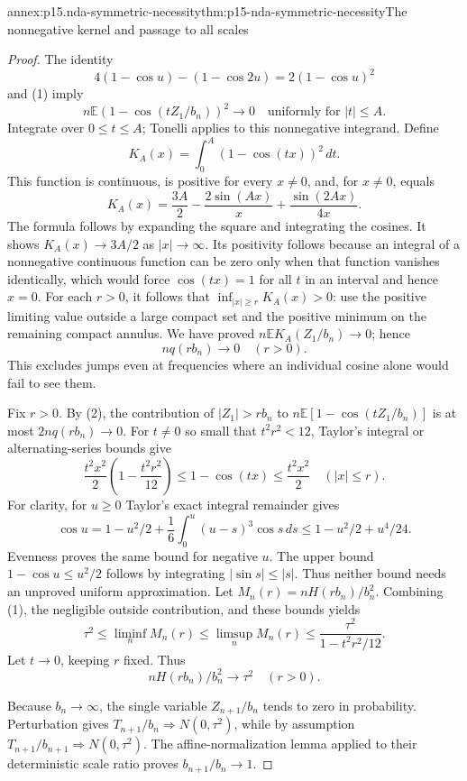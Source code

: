 \begin{annexitem}{annex:p15.nda-symmetric-necessity}{thm:p15-nda-symmetric-necessity}{The nonnegative kernel and passage to all scales}
\begin{proof}
The identity
\[
 4(1-\cos u)-(1-\cos2u)=2(1-\cos u)^2
 \]
and (1) imply
\[
 n\mathbb E(1-\cos(tZ_1/b_n))^2\longrightarrow0
                                  \quad\text{uniformly for }|t|\leq A.
 \]
Integrate over \(0\leq t\leq A\); Tonelli applies to this
nonnegative integrand. Define
\[
 K_A(x)=\int_0^A(1-\cos(tx))^2\,dt.
 \]
This function is continuous, is positive for every \(x\ne0\),
and, for \(x\ne0\), equals
\[
 K_A(x)=\frac{3A}{2}-\frac{2\sin(Ax)}x+\frac{\sin(2Ax)}{4x}.
 \]
The formula follows by expanding the square and integrating the
cosines. It shows \(K_A(x)\to3A/2\) as \(|x|\to\infty\).
Its positivity follows because an integral of a nonnegative
continuous function can be zero only when that function vanishes
identically, which would force \(\cos(tx)=1\) for all \(t\)
in an interval and hence \(x=0\).
For each \(r>0\), it follows that
\(\inf_{|x|\geq r}K_A(x)>0\): use the positive limiting value
outside a large compact set and the positive minimum on the
remaining compact annulus. We have proved
\(n\mathbb EK_A(Z_1/b_n)\to0\); hence
\[
 n q(rb_n)\to0\quad(r>0).                                \tag{2}
 \]
This excludes jumps even at frequencies where an individual
cosine alone would fail to see them.

Fix \(r>0\). By (2), the contribution of \(|Z_1|>rb_n\)
to \(n\mathbb E[1-\cos(tZ_1/b_n)]\) is at most
\(2nq(rb_n)\to0\). For \(t\ne0\) so small that
\(t^2r^2<12\), Taylor's integral or alternating-series bounds give
\[
 \frac{t^2x^2}{2}\left(1-\frac{t^2r^2}{12}\right)
 \leq1-\cos(tx)\leq\frac{t^2x^2}{2}\quad(|x|\leq r).
 \]
For clarity, for \(u\geq0\) Taylor's exact integral remainder gives
\[
 \cos u=1-u^2/2+
              \frac16\int_0^u(u-s)^3\cos s\,ds
          \leq1-u^2/2+u^4/24.
 \]
Evenness proves the same bound for negative \(u\). The upper bound
\(1-\cos u\leq u^2/2\) follows by integrating
\(|\sin s|\leq|s|\). Thus neither bound needs an unproved
uniform approximation.
Let \(M_n(r)=nH(rb_n)/b_n^2\).
Combining (1), the negligible outside contribution, and these
bounds yields
\[
 \tau^2\leq\liminf_n M_n(r)
 \leq\limsup_n M_n(r)
 \leq\frac{\tau^2}{1-t^2r^2/12}.
 \]
Let \(t\to0\), keeping \(r\) fixed. Thus
\[
 nH(rb_n)/b_n^2\to\tau^2\quad(r>0).                       \tag{3}
 \]

Because \(b_n\to\infty\), the single variable \(Z_{n+1}/b_n\)
tends to zero in probability. Perturbation gives
\(T_{n+1}/b_n\Rightarrow N(0,\tau^2)\), while by assumption
\(T_{n+1}/b_{n+1}\Rightarrow N(0,\tau^2)\).
The affine-normalization lemma applied to their deterministic
scale ratio proves \(b_{n+1}/b_n\to1\).


\end{proof}
\end{annexitem}
